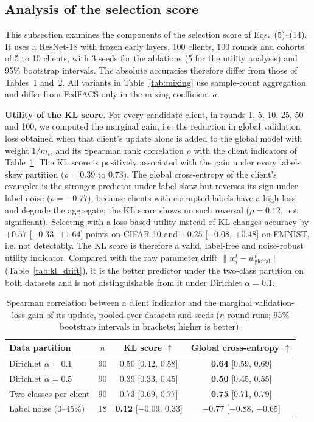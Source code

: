 \subsection{Analysis of the selection score}\label{sec:score_analysis}
This subsection examines the components of the selection score of Eqs.~(5)--(14). It uses a ResNet-18 with frozen early layers, 100 clients, 100 rounds and cohorts of 5 to 10 clients, with 3 seeds for the ablations (5 for the utility analysis) and 95\% bootstrap intervals. The absolute accuracies therefore differ from those of Tables~1 and~2. All variants in Table~\ref{tab:mixing} use sample-count aggregation and differ from FedFACS only in the mixing coefficient $a$.

\textbf{Utility of the KL score.} For every candidate client, in rounds 1, 5, 10, 25, 50 and 100, we computed the marginal gain, i.e. the reduction in global validation loss obtained when that client's update alone is added to the global model with weight $1/m_t$, and its Spearman rank correlation $\rho$ with the client indicators of Table~\ref{tab:kl_validity}. The KL score is positively associated with the gain under every label-skew partition ($\rho=0.39$ to $0.73$). The global cross-entropy of the client's examples is the stronger predictor under label skew but reverses its sign under label noise ($\rho=-0.77$), because clients with corrupted labels have a high loss and degrade the aggregate; the KL score shows no such reversal ($\rho=0.12$, not significant). Selecting with a loss-based utility instead of KL changes accuracy by $+0.57$ [$-0.33$, $+1.64$] points on CIFAR-10 and $+0.25$ [$-0.08$, $+0.48$] on FMNIST, i.e. not detectably. The KL score is therefore a valid, label-free and noise-robust utility indicator. Compared with the raw parameter drift $\lVert w_i^t-w_{\mathrm{global}}^t\rVert$ (Table~\ref{tab:kl_drift}), it is the better predictor under the two-class partition on both datasets and is not distinguishable from it under Dirichlet $\alpha=0.1$.

\begin{table}[!htbp]
\centering
\footnotesize
\setlength{\tabcolsep}{4pt}
\renewcommand{\arraystretch}{1.08}
\caption{Spearman correlation between a client indicator and the marginal validation-loss gain of its update, pooled over datasets and seeds ($n$ round-runs; 95\% bootstrap intervals in brackets; higher is better).}
\label{tab:kl_validity}
\begin{tabular*}{\journalfloatwidth}{@{\extracolsep{\fill}}lccc@{}}
\toprule
Data partition & $n$ & KL score $\uparrow$ & Global cross-entropy $\uparrow$ \\
\midrule
Dirichlet $\alpha=0.1$ & 90 & 0.50 [0.42, 0.58] & \textbf{0.64} [0.59, 0.69] \\
Dirichlet $\alpha=0.5$ & 90 & 0.39 [0.33, 0.45] & \textbf{0.50} [0.45, 0.55] \\
Two classes per client & 90 & 0.73 [0.69, 0.77] & \textbf{0.75} [0.71, 0.79] \\
Label noise (0--45\%)  & 18 & \textbf{0.12} [$-$0.09, 0.33] & $-$0.77 [$-$0.88, $-$0.65] \\
\bottomrule
\end{tabular*}
\end{table}

